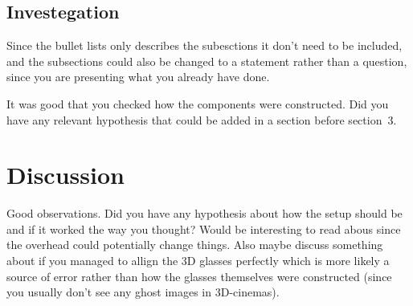 \documentclass{article}
\begin{document}
\subsection{Investegation}
Since the bullet lists only describes the subesctions it don't need to be included, and the subsections could also be changed to a statement rather than a question, since you are presenting what you already have done.

It was good that you checked how the components were constructed. Did you have any relevant hypothesis that could be added in a section before section~3. 

\section{Discussion}
Good observations. Did you have any hypothesis about how the setup should be and if it worked the way you thought? Would be interesting to read abous since the overhead could potentially change things. Also maybe discuss something about if you managed to allign the 3D glasses perfectly which is more likely a source of error rather than how the glasses themselves were constructed (since you usually don't see any ghost images in 3D-cinemas).
\end{document}
